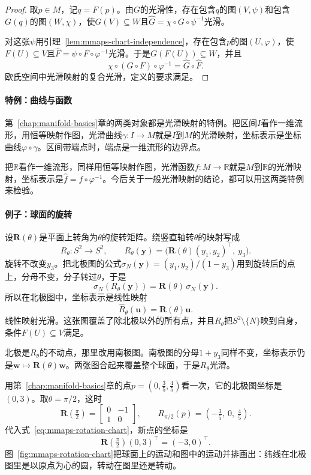 \begin{proof}
取$p\in M$，记$q=F(p)$。由$G$的光滑性，存在包含$q$的图$(V,\psi)$和包含$G(q)$的图$(W,\chi)$，使$G(V)\subseteq W$且$\hat G=\chi\circ G\circ\psi^{-1}$光滑。

对这张$\psi$用引理~\ref{lem:mmaps-chart-independence}，存在包含$p$的图$(U,\varphi)$，使$F(U)\subseteq V$且$\hat F=\psi\circ F\circ\varphi^{-1}$光滑。于是$G(F(U))\subseteq W$，并且
\[
\chi\circ(G\circ F)\circ\varphi^{-1}=\hat G\circ\hat F .
\]
欧氏空间中光滑映射的复合光滑，定义的要求满足。
\end{proof}

\paragraph{特例：曲线与函数}
第~\ref{chap:manifold-basics}章的两类对象都是光滑映射的特例。把区间$I$看作一维流形，用恒等映射作图，光滑曲线$\gamma:I\to M$就是$I$到$M$的光滑映射，坐标表示是坐标曲线$\varphi\circ\gamma$。区间带端点时，端点是一维流形的边界点。

把$\mathbb R$看作一维流形，同样用恒等映射作图，光滑函数$f:M\to\mathbb R$就是$M$到$\mathbb R$的光滑映射，坐标表示是$\hat f=f\circ\varphi^{-1}$。今后关于一般光滑映射的结论，都可以用这两类特例来检验。

\paragraph{例子：球面的旋转}
设$\bm R(\theta)$是平面上转角为$\theta$的旋转矩阵。绕竖直轴转$\theta$的映射写成
\[
R_\theta:S^2\to S^2,\qquad
R_\theta(\bm y)=\bigl(\bm R(\theta)(y_1,y_2)^\top,\ y_3\bigr).
\]
旋转不改变$y_3$。把北极图的公式$\sigma_N(\bm y)=(y_1,y_2)/(1-y_3)$用到旋转后的点上，分母不变，分子转过$\theta$，于是
\[
\sigma_N(R_\theta(\bm y))=\bm R(\theta)\,\sigma_N(\bm y).
\]
所以在北极图中，坐标表示是线性映射
\begin{equation}
\hat R_\theta(\bm u)=\bm R(\theta)\bm u .
\label{eq:mmaps-rotation-chart}
\end{equation}
线性映射光滑。这张图覆盖了除北极以外的所有点，并且$R_\theta$把$S^2\setminus\{N\}$映到自身，条件$F(U)\subseteq V$满足。

北极是$R_\theta$的不动点，那里改用南极图。南极图的分母$1+y_3$同样不变，坐标表示仍是$\bm w\mapsto\bm R(\theta)\bm w$。两张图合起来覆盖整个球面，于是$R_\theta$光滑。

用第~\ref{chap:manifold-basics}章的点$p=(0,\tfrac35,\tfrac45)$看一次，它的北极图坐标是$(0,3)$。取$\theta=\pi/2$，这时
\[
\bm R(\tfrac\pi2)=\begin{bmatrix}0&-1\\1&0\end{bmatrix},\qquad
R_{\pi/2}(p)=(-\tfrac35,\ 0,\ \tfrac45).
\]
代入式~\eqref{eq:mmaps-rotation-chart}，新点的坐标是
\[
\bm R(\tfrac\pi2)(0,3)^\top=(-3,0)^\top .
\]
图~\ref{fig:mmaps-rotation-chart}把球面上的运动和图中的运动并排画出：纬线在北极图里是以原点为心的圆，转动在图里还是转动。

